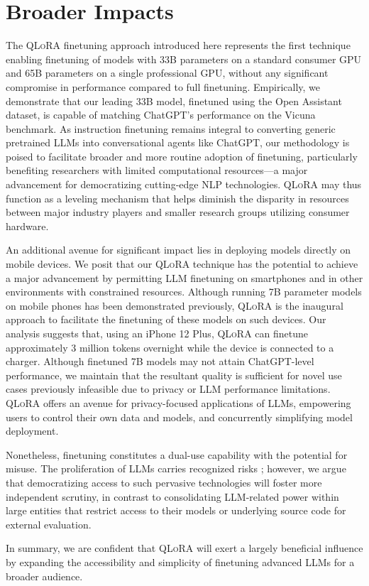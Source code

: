 \section{Broader Impacts}

The \textsc{QLoRA} finetuning approach introduced here represents the first technique enabling finetuning of models with 33B parameters on a standard consumer GPU and 65B parameters on a single professional GPU, without any significant compromise in performance compared to full finetuning. Empirically, we demonstrate that our leading 33B model, finetuned using the Open Assistant dataset, is capable of matching ChatGPT’s performance on the Vicuna benchmark. As instruction finetuning remains integral to converting generic pretrained LLMs into conversational agents like ChatGPT, our methodology is poised to facilitate broader and more routine adoption of finetuning, particularly benefiting researchers with limited computational resources—a major advancement for democratizing cutting-edge NLP technologies. \textsc{QLoRA} may thus function as a leveling mechanism that helps diminish the disparity in resources between major industry players and smaller research groups utilizing consumer hardware.

An additional avenue for significant impact lies in deploying models directly on mobile devices. We posit that our \textsc{QLoRA} technique has the potential to achieve a major advancement by permitting LLM finetuning on smartphones and in other environments with constrained resources. Although running 7B parameter models on mobile phones has been demonstrated previously, \textsc{QLoRA} is the inaugural approach to facilitate the finetuning of these models on such devices. Our analysis suggests that, using an iPhone 12 Plus, \textsc{QLoRA} can finetune approximately 3 million tokens overnight while the device is connected to a charger. Although finetuned 7B models may not attain ChatGPT-level performance, we maintain that the resultant quality is sufficient for novel use cases previously infeasible due to privacy or LLM performance limitations. \textsc{QLoRA} offers an avenue for privacy-focused applications of LLMs, empowering users to control their own data and models, and concurrently simplifying model deployment.

Nonetheless, finetuning constitutes a dual-use capability with the potential for misuse. The proliferation of LLMs carries recognized risks \citep{bommasani2021opportunities,bender2021dangers}; however, we argue that democratizing access to such pervasive technologies will foster more independent scrutiny, in contrast to consolidating LLM-related power within large entities that restrict access to their models or underlying source code for external evaluation.

In summary, we are confident that \textsc{QLoRA} will exert a largely beneficial influence by expanding the accessibility and simplicity of finetuning advanced LLMs for a broader audience.